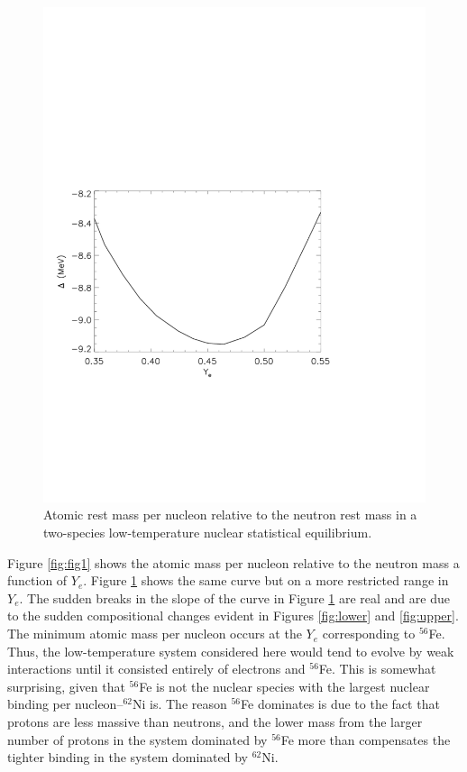 \documentclass{article}    %
\begin{document}
\begin{figure}[htp]
\centering
\includegraphics[width=5in]{figures/fig2}
\caption{Atomic rest mass per nucleon relative to the neutron rest mass in a
two-species low-temperature nuclear statistical equilibrium.}
\label{fig:fig2}
\end{figure}

Figure \ref{fig:fig1} shows the atomic mass per nucleon
relative to the neutron mass a function of $Y_e$.  Figure \ref{fig:fig2}
shows the same curve but on a more restricted range in $Y_e$.  The
sudden breaks in the slope of the curve in Figure \ref{fig:fig2} are real
and are due to the sudden compositional changes evident in Figures
\ref{fig:lower} and \ref{fig:upper}.  The minimum atomic
mass per nucleon occurs at the $Y_e$ corresponding to $^{56}$Fe.  Thus,
the low-temperature system considered here would tend to evolve by weak
interactions until it consisted entirely of electrons and $^{56}$Fe.
This is somewhat surprising, given that $^{56}$Fe is not the nuclear
species with the largest nuclear binding per nucleon--$^{62}$Ni is.  The
reason $^{56}$Fe dominates is due to the fact that protons are less
massive than neutrons, and the lower mass from the
larger number of protons in the system dominated by $^{56}$Fe more
than compensates the tighter binding in the system dominated by
$^{62}$Ni.
\end{document}
